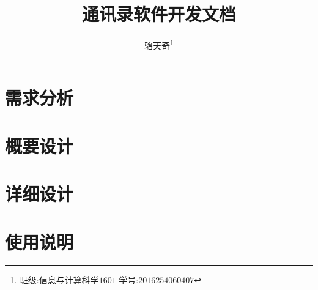 \documentclass[a4paper,14pt]{report}
\title{\fontsize{24}{0.1in}通讯录软件开发文档}
\author{骆天奇\thanks{班级:信息与计算科学$1601$  学号:$2016254060407$}}
\date{}
\begin{document}
	\maketitle
	\tableofcontents
	
	
	
	\chapter{需求分析}
		
	\chapter{概要设计}
		
	\chapter{详细设计}
		
	\chapter{使用说明}
		
	
%		
%		
%		
%		
%		
%		
\end{document}

